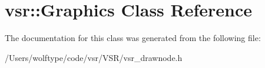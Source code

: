 \hypertarget{classvsr_1_1_graphics}{\section{vsr\-:\-:Graphics Class Reference}
\label{classvsr_1_1_graphics}
}


The documentation for this class was generated from the following file\-:\begin{DoxyCompactItemize}
\item 
/\-Users/wolftype/code/vsr/\-V\-S\-R/vsr\-\_\-drawnode.\-h\end{DoxyCompactItemize}
